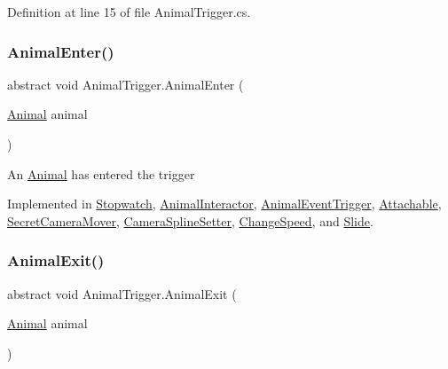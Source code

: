 Definition at line 15 of file Animal\+Trigger.\+cs.

\mbox{\label{class_animal_trigger_a03181803fa268e0bfcbdc752ee733c40}} 
\subsubsection{\texorpdfstring{Animal\+Enter()}{AnimalEnter()}}
{\footnotesize\ttfamily abstract void Animal\+Trigger.\+Animal\+Enter (\begin{DoxyParamCaption}\item[{\mbox{\hyperlink{class_animal}{Animal}}}]{animal }\end{DoxyParamCaption})\hspace{0.3cm}{\ttfamily [pure virtual]}}



An \mbox{\hyperlink{class_animal}{Animal}} has entered the trigger 



Implemented in \mbox{\hyperlink{class_stopwatch_abd930ea70de15bd24e05f63ba89a640e}{Stopwatch}}, \mbox{\hyperlink{class_animal_interactor_a91ee9e749597002a9d8b48055f3ee0ce}{Animal\+Interactor}}, \mbox{\hyperlink{class_animal_event_trigger_a99229b8cc15441fd184fb92747106d14}{Animal\+Event\+Trigger}}, \mbox{\hyperlink{class_attachable_a78b678ddd2860e245fd1ce5350414b8e}{Attachable}}, \mbox{\hyperlink{class_secret_camera_mover_a167a1c9a1b6de66a6789e4f9c4eb2633}{Secret\+Camera\+Mover}}, \mbox{\hyperlink{class_camera_spline_setter_a5669e29495356c82377ef7545cf29b3a}{Camera\+Spline\+Setter}}, \mbox{\hyperlink{class_change_speed_ae31f3a37d9eca8f2d055867035e02ca4}{Change\+Speed}}, and \mbox{\hyperlink{class_slide_a9ff3efb4447801dcd251378a66d5afa5}{Slide}}.

\mbox{\label{class_animal_trigger_aa1a7c2e90de76c2e089b2bae01813f5c}} 
\subsubsection{\texorpdfstring{Animal\+Exit()}{AnimalExit()}}
{\footnotesize\ttfamily abstract void Animal\+Trigger.\+Animal\+Exit (\begin{DoxyParamCaption}\item[{\mbox{\hyperlink{class_animal}{Animal}}}]{animal }\end{DoxyParamCaption})\hspace{0.3cm}{\ttfamily [pure virtual]}}



